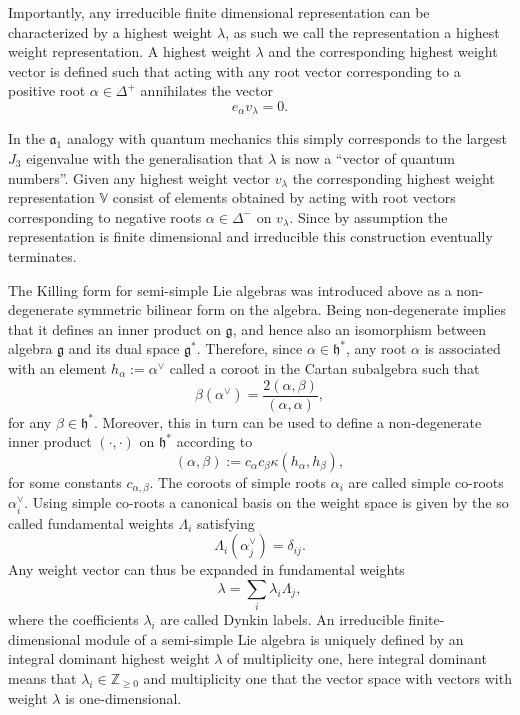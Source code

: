 Importantly, any irreducible finite dimensional representation can be characterized by a highest weight $\lambda$, as such we call the representation a highest weight representation. A highest weight $\lambda$ and the corresponding highest weight vector is defined such that acting with any root vector corresponding to a positive root $\alpha\in\Delta^+$ annihilates the vector
\begin{equation}
    e_\alpha v_\lambda = 0.
\end{equation}

In the $\mathfrak{a}_1$ analogy with quantum mechanics this simply corresponds to the largest $J_3$ eigenvalue with the generalisation that $\lambda$ is now a ``vector of quantum numbers''. Given any highest weight vector $v_\lambda$ the corresponding highest weight representation $\mathbb{V}$ consist of elements obtained by acting with root vectors corresponding to negative roots $\alpha\in\Delta^-$ on $v_\lambda$. Since by assumption the representation is finite dimensional and irreducible this construction eventually terminates.

The Killing form for semi-simple Lie algebras was introduced above as a non-degenerate symmetric bilinear form on the algebra. Being non-degenerate implies that it defines an inner product on $\mathfrak{g}$, and hence also an isomorphism between algebra $\mathfrak{g}$ and its dual space $\mathfrak{g}^*$. Therefore, since $\alpha\in\mathfrak{h}^*$, any root $\alpha$ is associated with an element $h_\alpha:=\alpha^\vee$ called a coroot in the Cartan subalgebra such that 
\begin{equation}\label{eq:CorootsDef}
    \beta(\alpha^\vee) = \frac{2(\alpha,\beta)}{(\alpha,\alpha)},
\end{equation}
for any $\beta\in\mathfrak{h}^*$. Moreover, this in turn can be used to define a non-degenerate inner product $(\cdot,\cdot)$ on $\mathfrak{h}^*$ according to
\begin{equation}
    (\alpha,\beta):= c_\alpha c_\beta \kappa(h_\alpha,h_\beta),
\end{equation}
for some constants $c_{\alpha,\beta}$. The coroots of simple roots $\alpha_{i}$ are called simple co-roots $\alpha_{i}^{\vee}$. Using simple co-roots a canonical basis on the weight space is given by the so called fundamental weights $\Lambda_{i}$ satisfying 
\begin{equation}\label{eq:FundWeights}
    \Lambda_i(\alpha_j^\vee) = \delta_{ij}.
\end{equation}
Any weight vector can thus be expanded in fundamental weights 
\begin{equation}
    \lambda = \sum_i \lambda_i\Lambda_{j},
\end{equation}
where the coefficients $\lambda_i$ are called Dynkin labels. An irreducible finite-dimensional module of a semi-simple Lie algebra is uniquely defined by an integral dominant highest weight $\lambda$ of multiplicity one, here integral dominant means that $\lambda_i\in \mathbb{Z}_{\geq 0}$ and multiplicity one that the vector space with vectors with weight $\lambda$ is one-dimensional.

